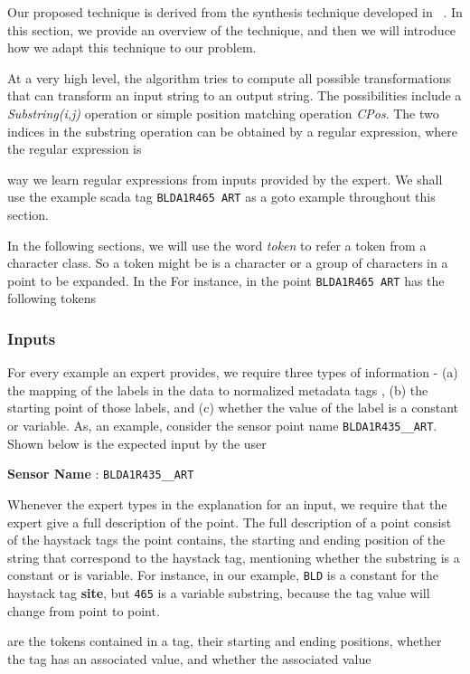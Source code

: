 Our proposed technique is derived from the synthesis technique developed in ~\cite{}. In this section, we provide an overview of the technique, and then we will introduce how we adapt this technique to our problem. 

At a very high level, the algorithm tries to compute all possible transformations that can transform an input string to an output string. The possibilities include a {\it Substring(i,j)} operation or simple position matching operation {\it{CPos}}. The two indices in the substring operation can be obtained by a regular expression, where the regular expression is  



 way we learn regular expressions from inputs provided by the expert. We shall use the example scada tag {\tt BLDA1R465  ART} as a goto example throughout this section.

In the following sections, we will use the word {\it token} to refer a token from a character class. So a token might be is a character or a group of characters in a point to be expanded. In the For instance, in the point {\tt BLDA1R465 ART} has the following tokens

\subsubsection{Inputs}

For every example an expert provides, we require three types of information - (a) the mapping of the labels in the data to normalized metadata tags , (b) the starting point of those labels, and (c) whether the value of the label is a constant or variable. As, an example, consider the sensor point name \texttt{BLDA1R435\_\_ART}. Shown below is the expected input by the user

{\bf Sensor Name} :   \texttt{BLDA1R435\_\_ART} 




Whenever the expert types in the explanation for an input, we require that the expert give a full description of the point. The full description of a point consist of the haystack tags the point contains, the starting and ending position of the string that correspond to the haystack tag, mentioning whether the substring is a constant or is variable. For instance, in our example, {\tt BLD} is a constant for the haystack tag {\bf site}, but {\tt 465} is a variable substring, because the tag value will change from point to point. 


are the tokens contained in a tag, their starting and ending positions, whether the tag has an associated value, and whether the associated value 


